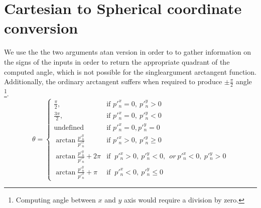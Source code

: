 \documentclass[journal,transmag]{IEEEtran}
\begin{document}
\IEEEdisplaynontitleabstractindextext



\IEEEpeerreviewmaketitle

















\appendices
\section{Cartesian to Spherical coordinate conversion}
\label{app:cartToSpherical}
We use the the two arguments atan version in order to to gather information on the signs of the inputs in order to return the appropriate quadrant of the computed angle, which is not possible for the singleargument arctangent function. Additionally, the ordinary arctangent  suffers when required to produce  $\pm \frac{\pi}{2} $ angle \footnote{Computing angle between $x$ and $y$ axis would require a division by zero.}.
\begin{equation*}
	\theta = 
	\begin{cases}
	
	\frac{\pi}{2},&\mbox{if }  p'^x_n=0, \ p'^y_n>0  \\
	
	\frac{3\pi}{2},&\mbox{if } p'^x_n=0, \ p'^y_n<0 \\
	
	\text{undefined} &\mbox{if } p'^x_n=0, p'^y_n =0 \\
	
	\arctan \frac{p'^y_n}{p'^x_n} &\mbox{if } p'^x_n>0, \ p'^y_n \ge 0  \\
	
	\arctan \frac{p'^y_n}{p'^x_n} + 2 \pi &\mbox{if } \ p'^x_n>0, \ p'^y_n < 0, \ \ or
	\ p'^x_n<0, \ p'^y_n > 0 \\
	
	\arctan \frac{p'^y_n}{p'^x_n} + \pi &\mbox{if }\ p'^x_n<0, \ p'^y_n \le 0 
	\end{cases}
\end{equation*}
\end{document}
